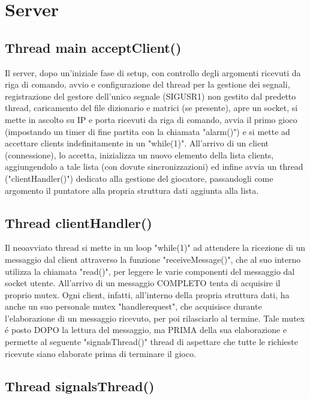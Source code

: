 \section{Server}

\subsection{Thread main acceptClient()}

Il server, dopo un'iniziale fase di setup, con controllo degli argomenti ricevuti da riga di comando, avvio e configurazione del thread per la gestione dei segnali, registrazione del gestore dell'unico segnale (SIGUSR1) non gestito dal predetto thread, caricamento del file dizionario e matrici (se presente), apre un socket, si mette in ascolto su IP e porta ricevuti da riga di comando, avvia il primo gioco (impostando un timer di fine partita con la chiamata "alarm()") e si mette ad accettare clients indefinitamente in un "while(1)". All'arrivo di un client (connessione), lo accetta, inizializza un nuovo elemento della lista clients, aggiungendolo a tale lista (con dovute sincronizzazioni) ed infine avvia un thread ("clientHandler()") dedicato alla gestione del giocatore, passandogli come argomento il puntatore alla propria struttura dati aggiunta alla lista.

 \subsection{Thread clientHandler()}

 Il neoavviato thread si mette in un loop "while(1)" ad attendere la ricezione di un messaggio dal client attraverso la funzione "receiveMessage()", che al suo interno utilizza la chiamata "read()", per leggere le varie componenti del messaggio dal socket utente. All'arrivo di un messaggio COMPLETO tenta di acquisire il proprio mutex. Ogni client, infatti, all'interno della propria struttura dati, ha anche un suo personale mutex "handlerequest", che acquisisce durante l'elaborazione di un messaggio ricevuto, per poi rilasciarlo al termine. Tale mutex \'e posto DOPO la lettura del messaggio, ma PRIMA della sua elaborazione e permette al seguente "signalsThread()" thread di aspettare che tutte le richieste ricevute siano elaborate prima di terminare il gioco.
 
 \subsection{Thread signalsThread()}

